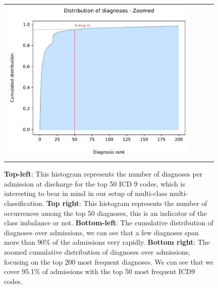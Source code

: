 \begin{figure}[H]
\begin{tabularx}{\textwidth}{XXXX}
  \includegraphics{figures/cdf-200.pdf} \\
 \end{tabularx}

 \caption{\textbf{Top-left}: This histogram represents the number of diagnoses per admission at discharge for the top 50 ICD 9 codes, which is interesting to bear in mind in our setup of multi-class multi-classification. \textbf{Top right}: This histogram represents the number of occurrences among the top 50 diagnoses, this is an indicator of the class imbalance or not. \textbf{Bottom-left}: The cumulative distribution of diagnoses over admissions, we can see that a few diagnoses span more than 90\% of the admissions very rapidly. \textbf{Bottom right}: The zoomed cumulative distribution of diagnoses over admissions, focusing on the top 200 most frequent diagnoses. We can see that we cover 95.1\% of admissions with the top 50 most frequent ICD9 codes.}
 \label{fig:icd9-codes}
\end{figure}